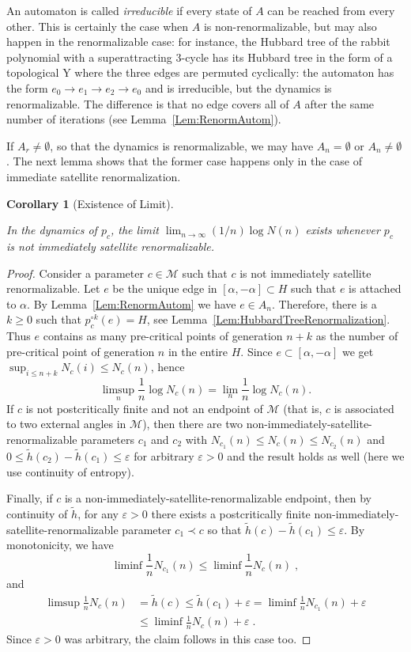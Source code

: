 \documentclass[12pt]{amsart}
\newcommand{\M}{\mathscr M}
\newcommand{\0}{\texttt{0}}
\newcommand{\1}{\texttt{1}}
\newcommand\eps{\varepsilon}
\newtheorem{corollary}[theorem]{Corollary}
\theoremstyle{definition}
\numberwithin{equation}{section}
\newcommand{\lineclear}{\rule{0pt}{2pt}\newline}
\begin{document}
An automaton is called \emph{irreducible} if every state of $A$ can be reached from every other. This is certainly the case when $A$ is non-renor\-ma\-li\-zable, but may also happen in the renormalizable case: for instance, the Hubbard tree of the rabbit polynomial with a superattracting $3$-cycle has its Hubbard tree in the form of a topological \textsf{Y} where the three edges are permuted cyclically: the automaton has the form $e_0\to e_1\to e_2\to e_0$ and is irreducible, but the dynamics is renormalizable. The difference is that no edge covers all of $A$ after the same number of iterations (see Lemma~\ref{Lem:RenormAutom}).

If $A_r\neq\emptyset$, so that the dynamics is renormalizable,  we may have $A_n=\emptyset$ or $A_n\neq \emptyset$. The next lemma shows that the former case happens only in the case of immediate satellite renormalization.



\begin{corollary}[Existence of Limit]
\label{Cor:ExistenceLimit} \lineclear
In the dynamics of $p_c$, the limit $\lim_{n\to\infty} (1/n)\log N(n)$ exists whenever $p_c$ is not immediately satellite renormalizable.
\end{corollary}
\begin{proof}
Consider a parameter $c\in\M$ such that $c$ is not immediately satellite renormalizable. Let $e$ be the unique edge in $[\alpha, -\alpha]\subset H$ such that $e$ is attached to $\alpha$. By Lemma~\ref{Lem:RenormAutom} we have $e\in A_n$. Therefore, there is a $k\ge 0$ such that $p_c^{\circ k}(e)=H$, see Lemma~\ref{Lem:HubbardTreeRenormalization}. Thus $e$ contains as many pre-critical points of generation $n+k$ as the number of pre-critical point of generation $n$ in the entire $H$. Since $e\subset [\alpha,-\alpha]$ we get $\sup _{i\le n+k}N_c(i)\le N_c(n)$, hence
\[
\limsup_n\frac 1 n \log N_c(n)=\lim_n\frac 1 n \log N_c(n).
\] 
 If $c$ is not postcritically finite and not an endpoint of $\M$ (that is, $c$ is associated to two external angles in $\M$), then there are two non-immediately-satellite-renormalizable parameters $c_1$ and $c_2$ with $N_{c_1}(n)\le N_c(n)\le N_{c_2}(n)$ and $0\le \tilde h(c_2)-\tilde h(c_1)\le\eps$ for arbitrary $\eps>0$ and the result holds as well (here we use continuity of entropy).

Finally, if $c$ is a non-immediately-satellite-renormalizable endpoint, then by continuity of $\tilde h$, for any $\eps>0$ there exists a postcritically finite non-immediately-satellite-renormalizable parameter $c_1\prec c$ so that $\tilde h(c)-\tilde h(c_1)\le \eps$. 
By monotonicity, we have 
\[
\liminf \frac 1 n N_{c_1}(n)  \le \liminf \frac 1 n N_c(n) \;,
\]
and 
\begin{align*}
\limsup \frac 1 n N_c(n)&=\tilde h(c)\le \tilde h(c_1)+\eps=\liminf \frac 1 n N_{c_1}(n)+\eps
\\ &\le \liminf \frac 1 n  N_{c}(n)+\eps
\;.
\end{align*}
Since $\eps>0$ was arbitrary, the claim follows in this case too.
\end{proof}
\end{document}
